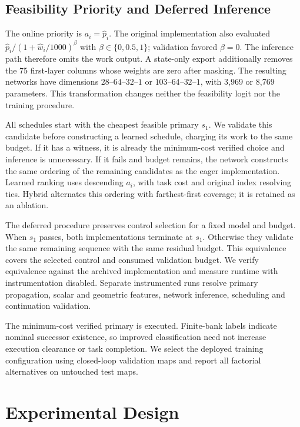 \documentclass[journal]{IEEEtran}
\begin{document}
\subsection{Feasibility Priority and Deferred Inference}
The online priority is $a_i=\hat p_i$. The original implementation also evaluated $\hat p_i/(1+\hat w_i/1000)^\beta$ with $\beta\in\{0,0.5,1\}$; validation favored $\beta=0$. The inference path therefore omits the work output. A state-only export additionally removes the 75 first-layer columns whose weights are zero after masking. The resulting networks have dimensions $28$--$64$--$32$--$1$ or $103$--$64$--$32$--$1$, with 3,969 or 8,769 parameters. This transformation changes neither the feasibility logit nor the training procedure.

All schedules start with the cheapest feasible primary $s_1$. We validate this candidate before constructing a learned schedule, charging its work to the same budget. If it has a witness, it is already the minimum-cost verified choice and inference is unnecessary. If it fails and budget remains, the network constructs the same ordering of the remaining candidates as the eager implementation. Learned ranking uses descending $a_i$, with task cost and original index resolving ties. Hybrid alternates this ordering with farthest-first coverage; it is retained as an ablation.

The deferred procedure preserves control selection for a fixed model and budget. When $s_1$ passes, both implementations terminate at $s_1$. Otherwise they validate the same remaining sequence with the same residual budget. This equivalence covers the selected control and consumed validation budget. We verify equivalence against the archived implementation and measure runtime with instrumentation disabled. Separate instrumented runs resolve primary propagation, scalar and geometric features, network inference, scheduling and continuation validation.

The minimum-cost verified primary is executed. Finite-bank labels indicate nominal successor existence, so improved classification need not increase execution clearance or task completion. We select the deployed training configuration using closed-loop validation maps and report all factorial alternatives on untouched test maps.

\section{Experimental Design}
\end{document}
